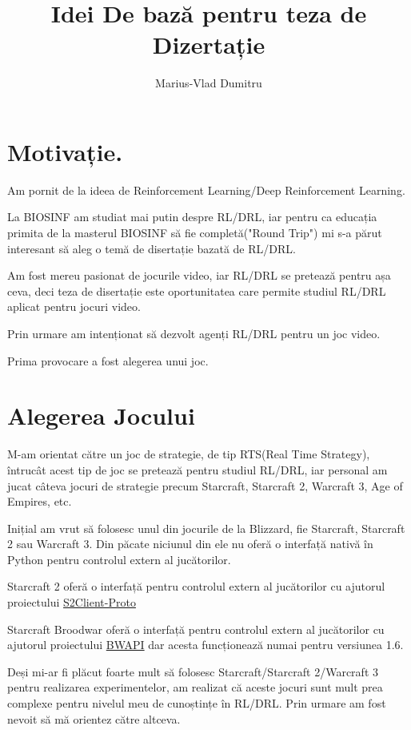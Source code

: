 \documentclass{article}
\title{Idei De bază pentru teza de Dizertație}
\author{Marius-Vlad Dumitru}
\begin{document}
\maketitle

\section{Motivație.}
Am pornit de la ideea de Reinforcement Learning/Deep Reinforcement Learning.

La BIOSINF am studiat mai putin despre RL/DRL, iar pentru ca educația primita de la masterul BIOSINF să fie completă("Round Trip") mi s-a părut interesant să aleg o temă de disertație bazată de RL/DRL.

Am fost mereu pasionat de jocurile video, iar RL/DRL se pretează pentru așa ceva, deci teza de disertație este oportunitatea care permite studiul RL/DRL aplicat pentru jocuri video.

Prin urmare am intenționat să dezvolt agenți RL/DRL pentru un joc video.

Prima provocare a fost alegerea unui joc.

\section{Alegerea Jocului}
M-am orientat către un joc de strategie, de tip RTS(Real Time Strategy), întrucât acest tip de joc se pretează pentru studiul RL/DRL, iar personal am jucat câteva jocuri de strategie precum Starcraft, Starcraft 2, Warcraft 3, Age of Empires, etc.

Inițial am vrut să folosesc unul din jocurile de la Blizzard, fie Starcraft, Starcraft 2 sau Warcraft 3. Din păcate niciunul din ele nu oferă o interfață nativă în Python pentru controlul extern al jucătorilor.

Starcraft 2 oferă o interfață pentru controlul extern al jucătorilor cu ajutorul proiectului \href{https://github.com/blizzard/s2client-proto}{S2Client-Proto}

Starcraft Broodwar oferă o interfață pentru controlul extern al jucătorilor cu ajutorul proiectului \href{https://bwapi.github.io/}{BWAPI} dar acesta funcționează numai pentru versiunea 1.6.

Deși mi-ar fi plăcut foarte mult să folosesc Starcraft/Starcraft 2/Warcraft 3 pentru realizarea experimentelor, am realizat că aceste jocuri sunt mult prea complexe pentru nivelul meu de cunoștințe în RL/DRL. Prin urmare am fost nevoit să mă orientez către altceva.
\end{document}
